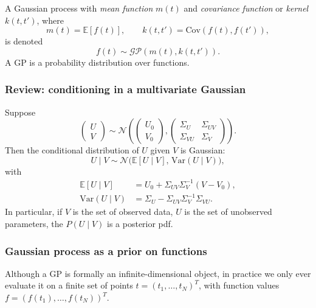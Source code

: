 \documentclass[11pt, titlepage]{article} %
\numberwithin{equation}{section}
\theoremstyle{definition}
\numberwithin{assumption}{section}
\begin{document}
A Gaussian process with \textit{mean function} $m(t)$ and \textit{covariance function} or \textit{kernel} $k(t,t')$, where
\begin{equation*}
    m(t)=\mathbb{E}[f(t)],
    \qquad
    k(t,t')=\mathrm{Cov}(f(t),f(t')),
\end{equation*}
is denoted
\begin{equation*}
    f(t)\sim \mathcal{GP}(m(t),k(t,t')).
\end{equation*}
A GP is a probability distribution over functions.


\subsubsection*{Review: conditioning in a multivariate Gaussian}

Suppose
\begin{equation*}
    \begin{pmatrix}
        U\\
        V
    \end{pmatrix}
    \sim
    \mathcal{N}\!\left(
    \begin{pmatrix}
        U_0\\
        V_0
    \end{pmatrix},
    \begin{pmatrix}
        \Sigma_U & \Sigma_{UV}\\
        \Sigma_{VU} & \Sigma_V
    \end{pmatrix}
    \right).
\end{equation*}
Then the conditional distribution of $U$ given $V$ is Gaussian:
\begin{equation*}
    U\mid V
    \sim
    \mathcal{N}\!\bigl(\mathbb{E}[U\mid V],\,\mathrm{Var}(U\mid V)\bigr),
\end{equation*}
with
\begin{align*}
    \mathbb{E}[U\mid V]
    &=
    U_0+\Sigma_{UV}\Sigma_V^{-1}(V-V_0),\\
    \mathrm{Var}(U\mid V)
    &=
    \Sigma_U-\Sigma_{UV}\Sigma_V^{-1}\Sigma_{VU}.
\end{align*}
In particular, if $V$ is the set of observed data, $U$ is the set of unobserved parameters, the $P(U\mid V)$ is a posterior pdf. 

\subsubsection*{Gaussian process as a prior on functions}
Although a GP is formally an infinite-dimensional object, in practice we only ever evaluate it on a finite set of points $t=(t_1,\dots,t_N)^T$, with function values $f=(f(t_1),\dots,f(t_N))^T$.
\end{document}
